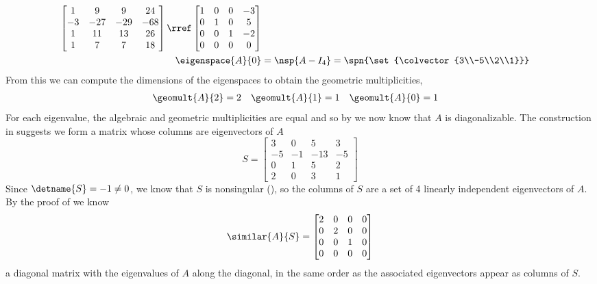 \begin{align*}
\begin{bmatrix}
 1 & 9 & 9 & 24 \\
 -3 & -27 & -29 & -68 \\
 1 & 11 & 13 & 26 \\
 1 & 7 & 7 & 18
\end{bmatrix}
\rref
\begin{bmatrix}
 1 & 0 & 0 & -3 \\
 0 & 1 & 0 & 5 \\
 0 & 0 & 1 & -2 \\
 0 & 0 & 0 & 0
\end{bmatrix}\\
%
\eigenspace{A}{0}&=\nsp{A-I_4}=\spn{\set{\colvector{3\\-5\\2\\1}}}
%
\end{align*}
%
From this we can compute the dimensions of the eigenspaces to obtain the geometric multiplicities,
%
\begin{align*}
\geomult{A}{2}&=2&
\geomult{A}{1}&=1&
\geomult{A}{0}&=1
\end{align*}
%
For each eigenvalue, the algebraic and geometric multiplicities are equal and so by  we now know that $A$ is diagonalizable.  The construction in  suggests we form a matrix whose columns are eigenvectors of $A$
%
\begin{equation*}
S=
\begin{bmatrix}
 3 & 0 & 5 & 3 \\
 -5 & -1 & -13 & -5 \\
 0 & 1 & 5 & 2 \\
 2 & 0 & 3 & 1
\end{bmatrix}
\end{equation*}
%
Since $\detname{S}=-1\neq 0$, we know that $S$ is nonsingular (), so the columns of $S$ are a set of 4 linearly independent eigenvectors of $A$.  By the proof of  we know
%
\begin{equation*}
\similar{A}{S}=
\begin{bmatrix}
 2 & 0 & 0 & 0 \\
 0 & 2 & 0 & 0 \\
 0 & 0 & 1 & 0 \\
 0 & 0 & 0 & 0
\end{bmatrix}
\end{equation*}
%
a diagonal matrix with the eigenvalues of $A$ along the diagonal, in the same order as the associated eigenvectors appear as columns of $S$.